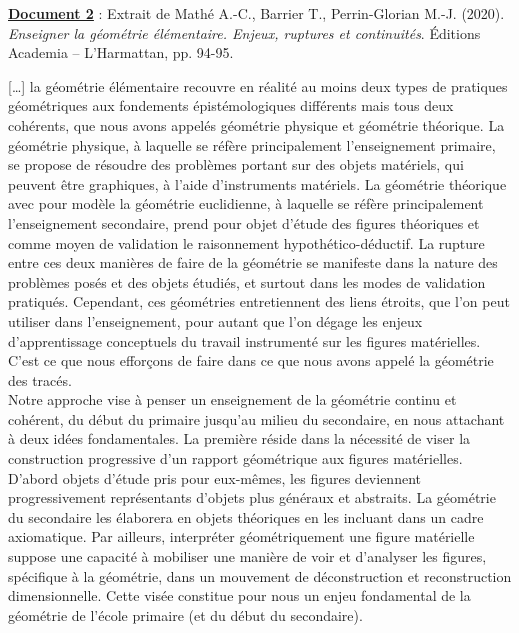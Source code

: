 {\bf\uline{Document 2}} : Extrait de Mathé A.-C., Barrier T., Perrin-Glorian M.-J. (2020). {\it Enseigner la géométrie élémentaire. Enjeux, ruptures et continuités}. Éditions Academia – L’Harmattan, pp. 94-95.
\begin{center}
   \begin{minipage}{16cm}
      \textsf{[…] la géométrie élémentaire recouvre en réalité au moins deux types de pratiques géométriques aux fondements épistémologiques différents mais tous deux cohérents, que nous avons appelés géométrie physique et géométrie théorique. La géométrie physique, à laquelle se réfère principalement l’enseignement primaire, se propose de résoudre des problèmes portant sur des objets matériels, qui peuvent être graphiques, à l’aide d’instruments matériels. La géométrie théorique avec pour modèle la géométrie euclidienne, à laquelle se réfère principalement l’enseignement secondaire, prend pour objet d’étude des figures théoriques et comme moyen de validation le raisonnement hypothético-déductif. La rupture entre ces deux manières de faire de la géométrie se manifeste dans la nature des problèmes posés et des objets étudiés, et surtout dans les modes de validation pratiqués. Cependant, ces géométries entretiennent des liens étroits, que l’on peut utiliser dans l’enseignement, pour autant que l’on dégage les enjeux d’apprentissage conceptuels du travail instrumenté sur les figures matérielles. C’est ce que nous efforçons de faire dans ce que nous avons appelé la géométrie des tracés. \\
Notre approche vise à penser un enseignement de la géométrie continu et cohérent, du début du primaire jusqu’au milieu du secondaire, en nous attachant à deux idées fondamentales. La première réside dans la nécessité de viser la construction progressive d’un rapport géométrique aux figures matérielles. D’abord objets d’étude pris pour eux-mêmes, les figures deviennent progressivement représentants d’objets plus généraux et abstraits. La géométrie du secondaire les élaborera en objets théoriques en les incluant dans un cadre axiomatique. Par ailleurs, interpréter géométriquement une figure matérielle suppose une capacité à mobiliser une manière de voir et d’analyser les figures, spécifique à la géométrie, dans un mouvement de déconstruction et reconstruction dimensionnelle. Cette visée constitue pour nous un enjeu fondamental de la géométrie de l’école primaire (et du début du secondaire). \\
}
\end{minipage}
\end{center}
